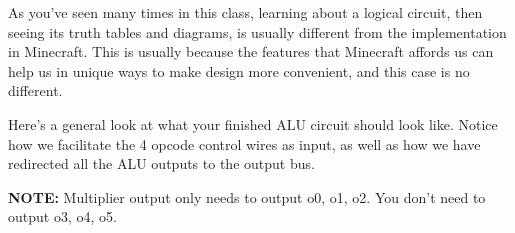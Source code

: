\documentclass{article}
\begin{document}
As you've seen many times in this class, learning about a logical circuit, then seeing its truth tables and diagrams, is usually different from the implementation in Minecraft.
This is usually because the features that Minecraft affords us can help us in unique ways to make design more convenient, and this case is no different.

Here's a general look at what your finished ALU circuit should look like.
Notice how we facilitate the 4 opcode control wires as input, as well as how we have redirected all the ALU outputs to the output bus.

\textbf{NOTE:} Multiplier output only needs to output o0, o1, o2. You don't need to output o3, o4, o5. 



\end{document}
